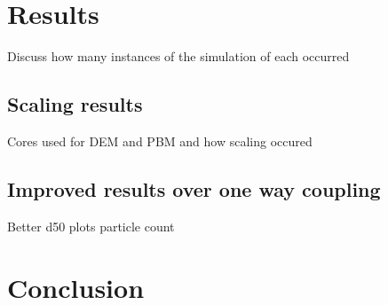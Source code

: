 \documentclass[fleqn,twoside,10pt]{article}
\begin{document}

\section{Results}
\label{results}
Discuss how many instances of the simulation of each occurred
\subsection{Scaling results}
Cores used for DEM and PBM and how scaling occured
\subsection{Improved results over one way coupling}
Better d50 plots particle count
\section{Conclusion}



\end{document}
